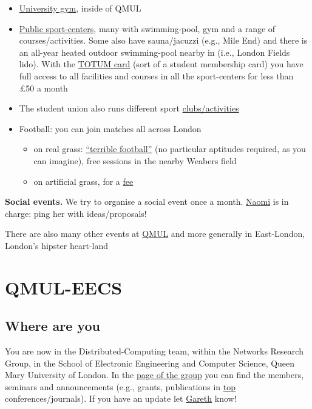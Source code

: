 \documentclass{article}
\begin{document}
\begin{itemize}
    \item \href{https://www.qmsu.org/qmotion/}{University gym}, inside of QMUL
    \item \href{https://www.better.org.uk}{Public sport-centers}, many with  swimming-pool, gym and a range of courses/activities. Some also have sauna/jacuzzi (e.g., Mile End) and there is an all-year heated outdoor swimming-pool nearby in (i.e., London Fields lido).
    With the \href{http://my.qmul.ac.uk/campus-and-city/deals-and-discounts/}{TOTUM card} (sort of a student membership card) you have full access to all facilities and courses in all the sport-centers for less than £50 a month
    \item The student union also runs different sport \href{https://www.qmsu.org/}{clubs/activities}
    \item Football: you can join matches all across London 
    \begin{itemize}
        \item on real grass: \href{https://www.meetup.com/Terrible-football-in-London/events}{``terrible football''} (no particular aptitudes required, as you can imagine), free sessions in the nearby Weabers field
        \item on artificial grass, for a \href{https://footyaddicts.com/}{fee}
    \end{itemize}
\end{itemize}      


\textbf{Social events.}
We try to organise a social event once a month. \href{mailto:n.a.arnold@qmul.ac.uk}{\href{mailto:n.a.arnold@qmul.ac.uk}{Naomi}} is in charge: ping her with ideas/proposals!

There are also many other events at \href{https://www.qmul.ac.uk/events/}{QMUL} and more generally in East-London, London's hipster heart-land


\section{QMUL-EECS}

\subsection{Where are you}
You are now in the Distributed-Computing team, within the Networks Research Group, in the School of Electronic Engineering and Computer Science, Queen Mary University of London. In the \href{http://networks.eecs.qmul.ac.uk/}{page of the group} you can find the members, seminars and announcements (e.g., grants, publications in \underline{top} conferences/journals). If you have an update let \href{mailto:g.tyson@qmul.ac.uk}{Gareth} know!  
\end{document}
